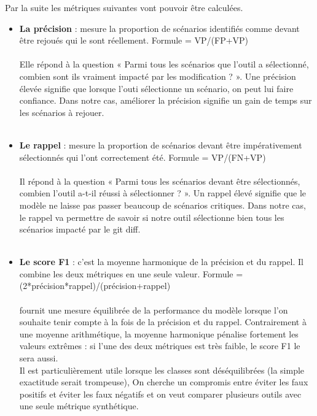 \documentclass[12pt,a4paper]{article}
\begin{document}
Par la suite les métriques suivantes vont pouvoir être calculées.                
\begin{itemize} 
    \item \textbf{La précision} :  mesure la proportion de scénarios identifiés comme devant être rejoués qui le sont réellement.
    Formule = VP/(FP+VP) \\\\
   Elle répond à la question « Parmi tous les scénarios que l'outil a sélectionné, combien sont ils vraiment impacté par les modification ? ». Une précision élevée signifie que lorsque l'outi sélectionne un scénario, on peut lui faire confiance. Dans notre cas, améliorer la précision signifie un gain de temps sur les scénarios à rejouer.\\\\
   \item \textbf{Le rappel} :  mesure la proportion de scénarios devant être impérativement sélectionnés qui l'ont correctement été.
    Formule = VP/(FN+VP) \\\\
   Il répond à la question « Parmi tous les scénarios devant être sélectionnés, combien l'outil a-t-il réussi à sélectionner ? ». Un rappel élevé signifie que le modèle ne laisse pas passer beaucoup de scénarios critiques. Dans notre cas, le rappel va permettre de savoir si notre outil sélectionne bien tous les scénarios impacté par le git diff.\\\\
   \item \textbf{Le score F1} : c'est la moyenne harmonique de la précision et du rappel. Il combine les deux métriques en une seule valeur.
    Formule = (2*précision*rappel)/(précision+rappel) \\\\
    fournit une mesure équilibrée de la performance du modèle lorsque l'on souhaite tenir compte à la fois de la précision et du rappel. Contrairement à une moyenne arithmétique, la moyenne   
  harmonique pénalise fortement les valeurs extrêmes : si l'une des deux métriques est très faible, le score F1 le sera aussi. \\Il est particulièrement utile lorsque les classes sont déséquilibrées (la simple exactitude serait trompeuse), On cherche un compromis entre éviter les faux positifs et éviter les faux négatifs et on veut comparer plusieurs outils avec une seule métrique synthétique.
   
   
                                                          
\end{itemize}
\end{document}
